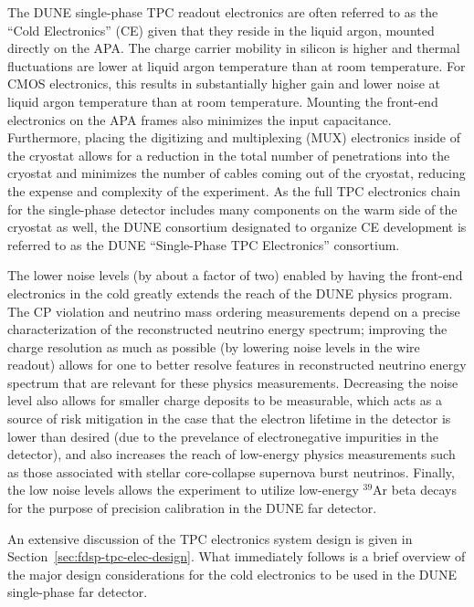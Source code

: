 The DUNE single-phase TPC readout electronics are often referred to as the ``Cold Electronics'' (CE) given that they reside in the liquid argon, mounted directly on the APA.  The charge carrier mobility in silicon is higher and thermal fluctuations are lower at liquid argon temperature than at room temperature.  For CMOS electronics, this results in substantially higher gain and lower noise at liquid argon temperature than at room temperature.  Mounting the front-end electronics on the APA frames also minimizes the input capacitance.  Furthermore, placing the digitizing and multiplexing (MUX) electronics inside of the cryostat allows for a reduction in the total number of penetrations into the cryostat and minimizes the number of cables coming out of the cryostat, reducing the expense and complexity of the experiment.  As the full TPC electronics chain for the single-phase detector includes many components on the warm side of the cryostat as well, the DUNE consortium designated to organize CE development is referred to as the DUNE ``Single-Phase TPC Electronics'' consortium.

The lower noise levels (by about a factor of two) enabled by having the front-end electronics in the cold greatly extends the reach of the DUNE physics program.  The CP violation and neutrino mass ordering measurements depend on a precise characterization of the reconstructed neutrino energy spectrum; improving the charge resolution as much as possible (by lowering noise levels in the wire readout) allows for one to better resolve features in reconstructed neutrino energy spectrum that are relevant for these physics measurements.  Decreasing the noise level also allows for smaller charge deposits to be measurable, which acts as a source of risk mitigation in the case that the electron lifetime in the detector is lower than desired (due to the prevelance of electronegative impurities in the detector), and also increases the reach of low-energy physics measurements such as those associated with stellar core-collapse supernova burst neutrinos.  Finally, the low noise levels allows the experiment to utilize low-energy $\mathrm{{}^{39}Ar}$ beta decays for the purpose of precision calibration in the DUNE far detector.

An extensive discussion of the TPC electronics system design is given in Section~\ref{sec:fdsp-tpc-elec-design}.  What immediately follows is a brief overview of the major design considerations for the cold electronics to be used in the DUNE single-phase far detector.
